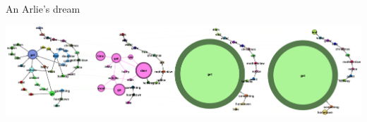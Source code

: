 \documentclass[xcolor=x11names,compress]{beamer}
\begin{document}
{
    \begin{frame}[t]{An Arlie's dream}
        \vspace{-0.2cm}
        
        
        
        
        \begin{minipage}[t]{\textwidth}
            \hspace{-0.7cm}
            \includegraphics[width=1.1\textwidth]{immagini/arlie_80_ml}
        \end{minipage}
    \end{frame}}
\end{document}
